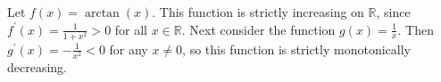 \begin{exm}\label{exm-differentiable-strictly-monotone}
	Let $f(x)=\arctan(x)$. This function is strictly increasing on $\mathbb{R}$,
	since $f^\prime(x)=\tfrac{1}{1+x^2}>0$ for all $x\in\mathbb{R}$. Next consider
	the function $g(x)=\tfrac{1}{x}$. Then $g^\prime(x)=-\tfrac{1}{x^2}<0$ for any
	$x\neq0$, so this function is strictly monotonically decreasing.
\end{exm}
